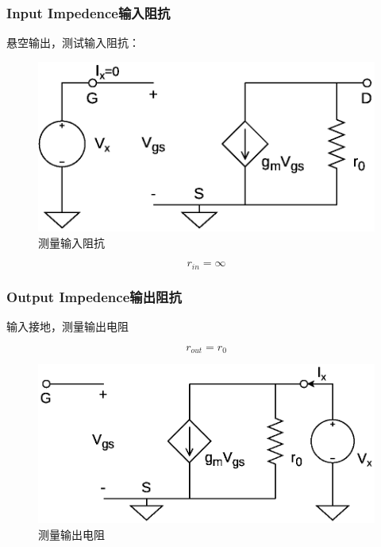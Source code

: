 \documentclass[twoside,a4paper,openright,titlepage,draft]{ctexrep}
\begin{document}
\subsubsection{Input Impedence输入阻抗}
悬空输出，测试输入阻抗：
\begin{multicols}{2}
    \begin{figure}[H]
        \centering
        \includegraphics[width=\columnwidth]{commonsourceinputimpedence.eps}
        \caption{测量输入阻抗}
        \label{fig:测量输入阻抗}
    \end{figure}
    \columnbreak
    \begin{equation}
        r_{in} = \infty
    \end{equation}
\end{multicols}

\subsubsection{Output Impedence输出阻抗}
输入接地，测量输出电阻
\begin{multicols}{2}
    \begin{equation}
        r_{out} = r_0
    \end{equation}
    \columnbreak
    \begin{figure}[H]
        \centering
        \includegraphics[width=\columnwidth]{commonsourceoutputimpedence.eps}
        \caption{测量输出电阻}
        \label{fig:测量输出电阻}
    \end{figure}
\end{multicols}
\end{document}
